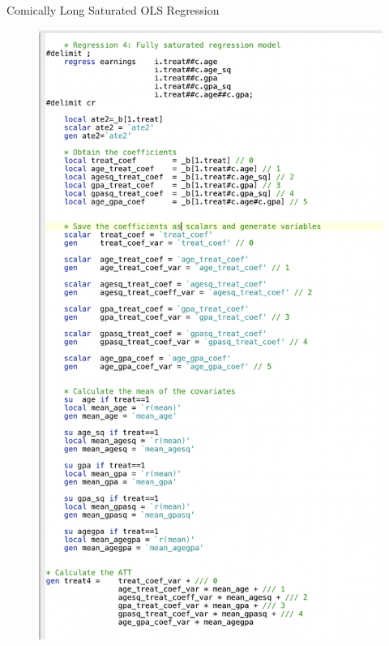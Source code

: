 \documentclass{beamer}
\begin{document}
\begin{frame}{Comically Long Saturated OLS Regression}

\begin{figure}[!t]\centering
\includegraphics[scale=0.26]{./lecture_includes/stata_full_code}
\end{figure}

\end{frame}
\end{document}
